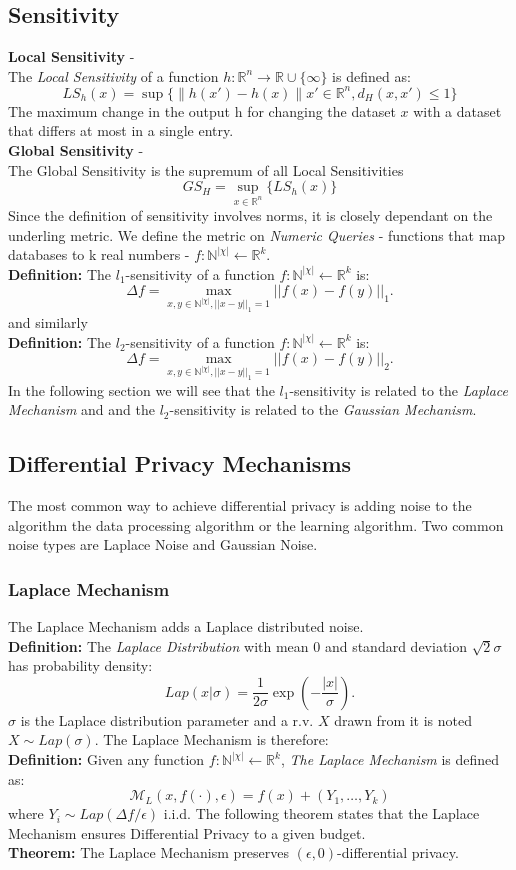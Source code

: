 \subsection{Sensitivity}
\textbf{Local Sensitivity} - \\
The \textit{Local Sensitivity} of a function $h:\mathbb{R}^{n}\rightarrow\mathbb{R} \cup \{\infty\}$ is defined as: 
$$LS_{h}(x)=\sup\{\|h(x')-h(x)\|x'\in\mathbb{R}^{n},d_{H}(x,x')\leq 1 \}$$
The maximum change in the output h for changing the dataset $x$ with a dataset that differs at most in a single entry. \\
\textbf{Global Sensitivity} - \\
The Global Sensitivity is the supremum of all Local Sensitivities 
$$GS_{H}=\sup\limits_{x\in\mathbb{R}^{n}}\{LS_{h}(x)\}$$
Since the definition of sensitivity involves norms, it is closely dependant on the underling metric. We define the metric on \textit{Numeric Queries} - functions that map databases to k real numbers -  $f: \mathbb{N}^{|\chi|} \leftarrow \mathbb{R}^{k}$.\\
\textbf{Definition:} The $l_{1}$-sensitivity of a function $f: \mathbb{N}^{|\chi|} \leftarrow \mathbb{R}^{k}$ is: 
$$ \Delta f = \max_{x,y \in \mathbb{N}^{|\chi|}, ||x-y||_{1}=1} || f(x) - f(y) ||_{1}.$$
and similarly \\
\textbf{Definition:} The $l_{2}$-sensitivity of a function $f: \mathbb{N}^{|\chi|} \leftarrow \mathbb{R}^{k}$ is: 
$$ \Delta f = \max_{x,y \in \mathbb{N}^{|\chi|}, ||x-y||_{1}=1} || f(x) - f(y) ||_{2}.$$
In the following section we will see that the $l_{1}$-sensitivity is related to the \textit{Laplace Mechanism} and and the $l_{2}$-sensitivity is related to the \textit{Gaussian Mechanism}.
\subsection{Differential Privacy Mechanisms}
The most common way to achieve differential privacy is adding noise to the algorithm the data processing algorithm or the learning algorithm. Two common noise types are Laplace Noise and Gaussian Noise.
\subsubsection{Laplace Mechanism}
The Laplace Mechanism adds a Laplace distributed noise. \\
\textbf{Definition:} The \textit{Laplace Distribution} with mean 0 and standard deviation $\sqrt{2} \sigma$ has probability density:
$$ Lap(x|\sigma)=\frac{1}{2\sigma}\exp \left (- \frac{|x|}{\sigma} \right ).$$ $\sigma$ is the Laplace distribution parameter and a r.v. $X$ drawn from it is noted $X \sim Lap(\sigma)$.
The Laplace Mechanism is therefore: \\
\textbf{Definition:} Given any function $f:\mathbb{N}^{|\chi|} \leftarrow \mathbb{R}^{k}$, \textit{The Laplace Mechanism} is defined as:
$$ \mathcal{M}_{L}(x,f(\cdot), \epsilon) = f(x)+(Y_{1},\ldots ,Y_{k})$$
where $Y_{i} \sim Lap(\Delta f / \epsilon)$ i.i.d.
The following theorem states that the Laplace Mechanism ensures Differential Privacy to a given budget. \\
\textbf{Theorem:} The Laplace Mechanism preserves $(\epsilon, 0)$-differential privacy.
